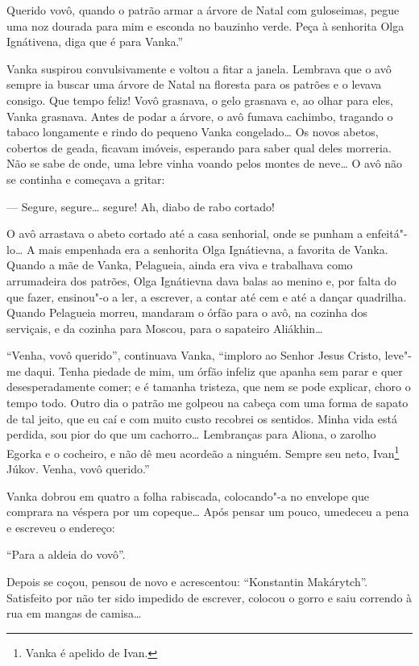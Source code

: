 Querido vovô, quando o patrão armar a árvore de Natal com guloseimas,
pegue uma noz dourada para mim e esconda no bauzinho verde. Peça à
senhorita Olga Ignátivena, diga que é para Vanka.''

Vanka suspirou convulsivamente e voltou a fitar a janela. Lembrava que o
avô sempre ia buscar uma árvore de Natal na floresta para os patrões e o
levava consigo. Que tempo feliz! Vovô grasnava, o gelo grasnava e, ao
olhar para eles, Vanka grasnava. Antes de podar a árvore, o avô fumava
cachimbo, tragando o tabaco longamente e rindo do pequeno Vanka
congelado\ldots{} Os novos abetos, cobertos de geada, ficavam imóveis,
esperando para saber qual deles morreria. Não se sabe de onde, uma lebre
vinha voando pelos montes de neve\ldots{} O avô não se continha e começava a
gritar:

--- Segure, segure\ldots{} segure! Ah, diabo de rabo cortado!

O avô arrastava o abeto cortado até a casa senhorial, onde se punham a
enfeitá"-lo\ldots{} A mais empenhada era a senhorita Olga Ignátievna, a
favorita de Vanka. Quando a mãe de Vanka, Pelagueia, ainda era viva e
trabalhava como arrumadeira dos patrões, Olga Ignátievna dava balas ao
menino e, por falta do que fazer, ensinou"-o a ler, a escrever, a contar
até cem e até a dançar quadrilha. Quando Pelagueia morreu, mandaram o
órfão para o avô, na cozinha dos serviçais, e da cozinha para Moscou,
para o sapateiro Aliákhin\ldots{}

``Venha, vovô querido'', continuava Vanka, ``imploro ao Senhor Jesus
Cristo, leve"-me daqui. Tenha piedade de mim, um órfão infeliz que apanha
sem parar e quer desesperadamente comer; e é tamanha tristeza, que nem
se pode explicar, choro o tempo todo. Outro dia o patrão me golpeou na
cabeça com uma forma de sapato de tal jeito, que eu caí e com muito
custo recobrei os sentidos. Minha vida está perdida, sou pior do que um
cachorro\ldots{} Lembranças para Aliona, o zarolho Egorka e o cocheiro, e não
dê meu acordeão a ninguém. Sempre seu neto, Ivan\footnote{Vanka é
  apelido de Ivan.} Júkov. Venha, vovô querido.''

Vanka dobrou em quatro a folha rabiscada, colocando"-a no envelope que
comprara na véspera por um copeque\ldots{} Após pensar um pouco, umedeceu a
pena e escreveu o endereço:

``Para a aldeia do vovô''.

Depois se coçou, pensou de novo e acrescentou: ``Konstantin Makárytch''.
Satisfeito por não ter sido impedido de escrever, colocou o gorro e saiu
correndo à rua em mangas de camisa\ldots{}

